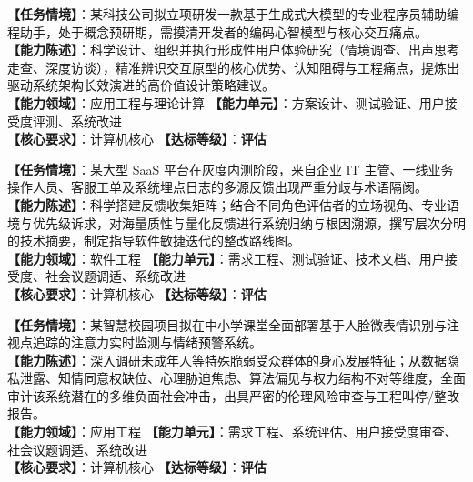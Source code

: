 \begin{taskbox}
\textbf{【任务情境】}：某科技公司拟立项研发一款基于生成式大模型的专业程序员辅助编程助手，处于概念预研期，需摸清开发者的编码心智模型与核心交互痛点。\\
\textbf{【能力陈述】}：科学设计、组织并执行形成性用户体验研究（情境调查、出声思考走查、深度访谈），精准辨识交互原型的核心优势、认知阻碍与工程痛点，提炼出驱动系统架构长效演进的高价值设计策略建议。\\
\textbf{【能力领域】}：应用工程与理论计算 \quad \textbf{【能力单元】}：方案设计、测试验证、用户接受度评测、系统改进\\
\textbf{【核心要求】}：计算机核心 \quad \textbf{【达标等级】}：\textbf{评估}
\end{taskbox}

\begin{taskbox}
\textbf{【任务情境】}：某大型 SaaS 平台在灰度内测阶段，来自企业 IT 主管、一线业务操作人员、客服工单及系统埋点日志的多源反馈出现严重分歧与术语隔阂。\\
\textbf{【能力陈述】}：科学搭建反馈收集矩阵；结合不同角色评估者的立场视角、专业语境与优先级诉求，对海量质性与量化反馈进行系统归纳与根因溯源，撰写层次分明的技术摘要，制定指导软件敏捷迭代的整改路线图。\\
\textbf{【能力领域】}：软件工程 \quad \textbf{【能力单元】}：需求工程、测试验证、技术文档、用户接受度、社会议题调适、系统改进\\
\textbf{【核心要求】}：计算机核心 \quad \textbf{【达标等级】}：\textbf{评估}
\end{taskbox}

\begin{taskbox}[任务 9：面向特定敏感脆弱人群部署交互系统的社会伦理与技术风险综合审计]
\textbf{【任务情境】}：某智慧校园项目拟在中小学课堂全面部署基于人脸微表情识别与注视点追踪的注意力实时监测与情绪预警系统。\\
\textbf{【能力陈述】}：深入调研未成年人等特殊脆弱受众群体的身心发展特征；从数据隐私泄露、知情同意权缺位、心理胁迫焦虑、算法偏见与权力结构不对等维度，全面审计该系统潜在的多维负面社会冲击，出具严密的伦理风险审查与工程叫停/整改报告。\\
\textbf{【能力领域】}：应用工程 \quad \textbf{【能力单元】}：需求工程、系统评估、用户接受度审查、社会议题调适、系统改进\\
\textbf{【核心要求】}：计算机核心 \quad \textbf{【达标等级】}：\textbf{评估}
\end{taskbox}

